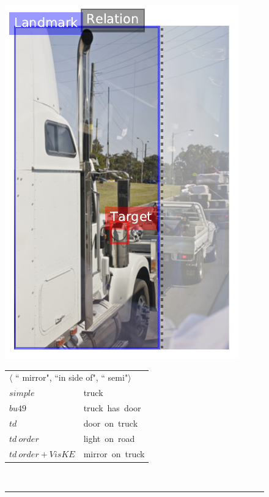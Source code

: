 \begin{figure}[hb]
\begin{minipage}{\textwidth}
\begin{minipage}{0.3\textwidth}
			\includegraphics[scale=0.3]{studies/inlg2019/figures/2417890_mirror_on_side_of_semi.pdf}
		\end{minipage}%
		\begin{minipage}{0.7\textwidth}%
			\begin{tabular}{|ll}
				\multicolumn{2}{|l}{$\langle$ ``{\color{red} mirror}", ``in side of", ``{\color{blue} semi}"$\rangle$} \\
				$simple$         & {truck} \\
				$bu49$           & {truck~has~door} \\
				$td$             & {door~on~truck} \\
				$td~order$       & {light~on~road} \\
				$td~order+VisKE$ & {mirror~on~truck} \\
			\end{tabular}
		\end{minipage}\\
		\rule{\textwidth}{0.5pt}
		\begin{minipage}{0.3\textwidth}
			\centering

\end{minipage}
\end{minipage}
\end{figure}
